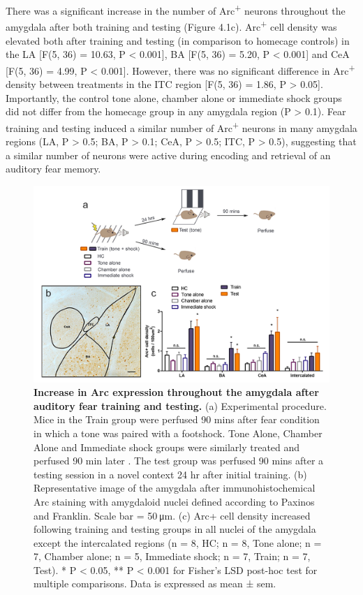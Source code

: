 \documentclass[12pt,a4paper,]{report}
\begin{document}
There was a significant increase in the number of Arc\textsuperscript{+}
neurons throughout the amygdala after both training and testing (Figure
4.1c). Arc\textsuperscript{+} cell density was elevated both after
training and testing (in comparison to homecage controls) in the LA
{[}F(5, 36) = 10.63, P \textless{} 0.001{]}, BA {[}F(5, 36) = 5.20, P
\textless{} 0.001{]} and CeA {[}F(5, 36) = 4.99, P \textless{} 0.001{]}.
However, there was no significant difference in Arc\textsuperscript{+}
density between treatments in the ITC region {[}F(5, 36) = 1.86, P
\textgreater{} 0.05{]}. Importantly, the control tone alone, chamber
alone or immediate shock groups did not differ from the homecage group
in any amygdala region (P \textgreater{} 0.1). Fear training and testing
induced a similar number of Arc\textsuperscript{+} neurons in many
amygdala regions (LA, P \textgreater{} 0.5; BA, P \textgreater{} 0.1;
CeA, P \textgreater{} 0.5; ITC, P \textgreater{} 0.5), suggesting that a
similar number of neurons were active during encoding and retrieval of
an auditory fear memory.

\begin{figure}[htbp]
\centering
\includegraphics{source/figures/figure_1.jpg}
\caption{\textbf{Increase in Arc expression throughout the amygdala
after auditory fear training and testing.} (a) Experimental procedure.
Mice in the Train group were perfused 90 mins after fear condition in
which a tone was paired with a footshock. Tone Alone, Chamber Alone and
Immediate shock groups were similarly treated and perfused 90 min later
. The test group was perfused 90 mins after a testing session in a novel
context 24 hr after initial training. (b) Representative image of the
amygdala after immunohistochemical Arc staining with amygdaloid nuclei
defined according to Paxinos and Franklin. Scale bar = 50 μm. (c) Arc+
cell density increased following training and testing groups in all
nuclei of the amygdala except the intercalated regions (n = 8, HC; n =
8, Tone alone; n = 7, Chamber alone; n = 5, Immediate shock; n = 7,
Train; n = 7, Test). * P \textless{} 0.05, ** P \textless{} 0.001 for
Fisher's LSD post-hoc test for multiple comparisons. Data is expressed
as mean ± sem. \label{ref_a_figure}}
\end{figure}
\end{document}
